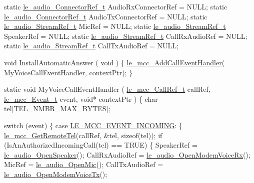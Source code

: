 \begin{DoxyCode}
\textcolor{keyword}{static} \hyperlink{le__audio__interface_8h_ab819480f4ce3f36e62b6a4e327668304}{le\_audio\_ConnectorRef\_t} AudioRxConnectorRef = NULL;
\textcolor{keyword}{static} \hyperlink{le__audio__interface_8h_ab819480f4ce3f36e62b6a4e327668304}{le\_audio\_ConnectorRef\_t} AudioTxConnectorRef = NULL;
\textcolor{keyword}{static} \hyperlink{le__audio__interface_8h_a9a46ff5a5afa61f1bc76120ab9e4da0a}{le\_audio\_StreamRef\_t} MicRef = NULL;
\textcolor{keyword}{static} \hyperlink{le__audio__interface_8h_a9a46ff5a5afa61f1bc76120ab9e4da0a}{le\_audio\_StreamRef\_t} SpeakerRef = NULL;
\textcolor{keyword}{static} \hyperlink{le__audio__interface_8h_a9a46ff5a5afa61f1bc76120ab9e4da0a}{le\_audio\_StreamRef\_t} CallRxAudioRef = NULL;
\textcolor{keyword}{static} \hyperlink{le__audio__interface_8h_a9a46ff5a5afa61f1bc76120ab9e4da0a}{le\_audio\_StreamRef\_t} CallTxAudioRef = NULL;

\textcolor{keywordtype}{void} InstallAutomaticAnswer
(
    \textcolor{keywordtype}{void}
)
\{
    \hyperlink{le__mcc__interface_8h_ab826cf4b9e3911e659a90d483081e7fe}{le\_mcc\_AddCallEventHandler}(   MyVoiceCallEventHandler,
                                       contextPtr);
\}


\textcolor{keyword}{static} \textcolor{keywordtype}{void} MyVoiceCallEventHandler
(
    \hyperlink{le__mcc__interface_8h_a8ae6dac3ca12854884d63e17d5388a7a}{le\_mcc\_CallRef\_t} callRef,
    \hyperlink{le__mcc__interface_8h_aefc4679ffa76d0e04c578572c22f06cf}{le\_mcc\_Event\_t}   event,
    \textcolor{keywordtype}{void}*            contextPtr
)
\{
    \textcolor{keywordtype}{char}                tel[TEL\_NMBR\_MAX\_BYTES];

    \textcolor{keywordflow}{switch} (event)
    \{
        \textcolor{keywordflow}{case} \hyperlink{le__mcc__interface_8h_aefc4679ffa76d0e04c578572c22f06cfab37936f33d31259ea0c16169ba852bd0}{LE\_MCC\_EVENT\_INCOMING}:
            \{
                \hyperlink{le__mcc__interface_8h_aeae32829e9a5fa864167df3ee67d0f41}{le\_mcc\_GetRemoteTel}(callRef, &tel, \textcolor{keyword}{sizeof}(tel));
                \textcolor{keywordflow}{if} (IsAnAuthorizedIncomingCall(tel) == TRUE)
                \{
                    SpeakerRef = \hyperlink{le__audio__interface_8h_a5c19afce44021c4abf6193707317f8de}{le\_audio\_OpenSpeaker}();
                    CallRxAudioRef = \hyperlink{le__audio__interface_8h_ae3ed568ba4d2763ea77e17e77b20ff02}{le\_audio\_OpenModemVoiceRx}();
                    MicRef = \hyperlink{le__audio__interface_8h_a74f1ef979329f6c2bd56ea622f4d05b2}{le\_audio\_OpenMic}();
                    CallTxAudioRef = \hyperlink{le__audio__interface_8h_ad745f008bb04873c817da7af3daf783d}{le\_audio\_OpenModemVoiceTx}();


\end{DoxyCode}
